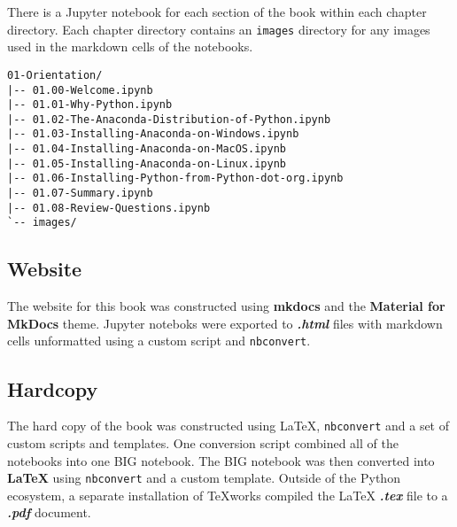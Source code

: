 \documentclass{book}
\newcommand{\passthrough}[1]{#1}
\begin{document}
There is a Jupyter notebook for each section of the book within each
chapter directory. Each chapter directory contains an
\passthrough{\lstinline!images!} directory for any images used in the
markdown cells of the notebooks.

\begin{lstlisting}
01-Orientation/
|-- 01.00-Welcome.ipynb
|-- 01.01-Why-Python.ipynb
|-- 01.02-The-Anaconda-Distribution-of-Python.ipynb
|-- 01.03-Installing-Anaconda-on-Windows.ipynb
|-- 01.04-Installing-Anaconda-on-MacOS.ipynb
|-- 01.05-Installing-Anaconda-on-Linux.ipynb
|-- 01.06-Installing-Python-from-Python-dot-org.ipynb
|-- 01.07-Summary.ipynb
|-- 01.08-Review-Questions.ipynb
`-- images/
\end{lstlisting}
    




    
        \hypertarget{website}{%
\subsection{Website}\label{website}}
    




    
        The website for this book was constructed using \textbf{mkdocs} and the
\textbf{Material for MkDocs} theme. Jupyter noteboks were exported to
\textbf{\emph{.html}} files with markdown cells unformatted using a
custom script and \passthrough{\lstinline!nbconvert!}.
    




    
        \hypertarget{hardcopy}{%
\subsection{Hardcopy}\label{hardcopy}}
    




    
        The hard copy of the book was constructed using LaTeX,
\passthrough{\lstinline!nbconvert!} and a set of custom scripts and
templates. One conversion script combined all of the notebooks into one
BIG notebook. The BIG notebook was then converted into \textbf{LaTeX}
using \passthrough{\lstinline!nbconvert!} and a custom template. Outside
of the Python ecosystem, a separate installation of TeXworks compiled
the LaTeX \textbf{\emph{.tex}} file to a \textbf{\emph{.pdf}} document.
    
\end{document}
